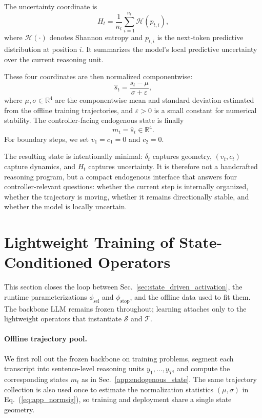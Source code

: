 The uncertainty coordinate is
\begin{equation}
H_t=
\frac{1}{n_t}\sum_{i=1}^{n_t}\mathcal{H}(p_{t,i}),
\label{eq:app_H}
\end{equation}
where \(\mathcal{H}(\cdot)\) denotes Shannon entropy and \(p_{t,i}\) is the next-token predictive distribution at position \(i\). 
It summarizes the model's local predictive uncertainty over the current reasoning unit.

These four coordinates are then normalized componentwise:
\begin{equation}
\hat s_t=\frac{s_t-\mu}{\sigma+\varepsilon},
\label{eq:app_normsig}
\end{equation}
where \(\mu,\sigma\in\mathbb{R}^{4}\) are the componentwise mean and standard deviation estimated from the offline training trajectories, and \(\varepsilon>0\) is a small constant for numerical stability. 
The controller-facing endogenous state is finally
\begin{equation}
m_t=\hat s_t\in\mathbb{R}^{4}.
\label{eq:app_m}
\end{equation}
For boundary steps, we set \(v_1=c_1=0\) and \(c_2=0\).

The resulting state is intentionally minimal: \(\delta_t\) captures geometry, \((v_t,c_t)\) capture dynamics, and \(H_t\) captures uncertainty. 
It is therefore not a handcrafted reasoning program, but a compact endogenous interface that answers four controller-relevant questions: whether the current step is internally organized, whether the trajectory is moving, whether it remains directionally stable, and whether the model is locally uncertain.

\section{Lightweight Training of State-Conditioned Operators}
\label{app:training_method}

This section closes the loop between Sec.~\ref{sec:state_driven_activation}, the runtime parameterizations \(\phi_{\mathrm{sel}}\) and \(\phi_{\mathrm{stop}}\), and the offline data used to fit them. 
The backbone LLM remains frozen throughout; learning attaches only to the lightweight operators that instantiate \(\mathcal{S}\) and \(\mathcal{T}\).

\paragraph{Offline trajectory pool.}
We first roll out the frozen backbone on training problems, segment each transcript into sentence-level reasoning units \(y_1,\dots,y_T\), and compute the corresponding states \(m_t\) as in Sec.~\ref{app:endogenous_state}. 
The same trajectory collection is also used once to estimate the normalization statistics \((\mu,\sigma)\) in Eq.~(\ref{eq:app_normsig}), so training and deployment share a single state geometry.

